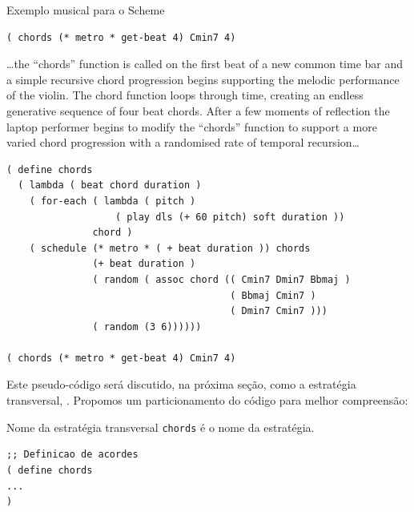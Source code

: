 \begin{example}{Exemplo musical para o Scheme}
\begin{verbatim}
( chords (* metro * get-beat 4) Cmin7 4)
\end{verbatim}

\begin{citacao}
{\ldots the “chords” function is called on the first beat of a new common time bar and a simple recursive chord progression begins supporting the melodic performance of the violin. The chord function loops through time, creating an endless generative sequence of four beat chords. After a few moments of reflection the laptop performer begins to modify the “chords” function to support a more varied chord progression with a randomised rate of temporal recursion\ldots}
\end{citacao}

\begin{verbatim}
( define chords
  ( lambda ( beat chord duration )
    ( for-each ( lambda ( pitch )
                   ( play dls (+ 60 pitch) soft duration ))
               chord )
    ( schedule (* metro * ( + beat duration )) chords
               (+ beat duration )
               ( random ( assoc chord (( Cmin7 Dmin7 Bbmaj )
                                       ( Bbmaj Cmin7 )
                                       ( Dmin7 Cmin7 )))
               ( random (3 6))))))

( chords (* metro * get-beat 4) Cmin7 4)
\end{verbatim}
\end{example}

Este pseudo-código será discutido, na próxima seção, como a estratégia transversal, . Propomos um particionamento do código para melhor compreensão:

\begin{example}{Nome da estratégia transversal}
\verb|chords| é o nome da estratégia.

\begin{verbatim}
;; Definicao de acordes
( define chords
...
)
\end{verbatim}
\end{example}

